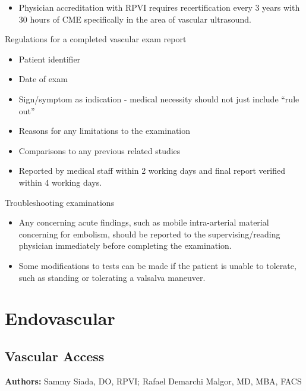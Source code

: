 \documentclass[
]{book}
\providecommand{\tightlist}{%
  \setlength{\itemsep}{0pt}\setlength{\parskip}{0pt}}
\begin{document}
\begin{itemize}
\tightlist
\item
  Physician accreditation with RPVI requires recertification every 3
  years with 30 hours of CME specifically in the area of vascular
  ultrasound.
\end{itemize}

Regulations for a completed vascular exam report\citep{iac2021}

\begin{itemize}
\item
  Patient identifier
\item
  Date of exam
\item
  Sign/symptom as indication - medical necessity should not just
  include ``rule out''
\item
  Reasons for any limitations to the examination
\item
  Comparisons to any previous related studies
\item
  Reported by medical staff within 2 working days and final report
  verified within 4 working days.
\end{itemize}

Troubleshooting examinations

\begin{itemize}
\item
  Any concerning acute findings, such as mobile intra-arterial
  material concerning for embolism, should be reported to the
  supervising/reading physician immediately before completing the
  examination.\citep{societyofdiagnosticmedicalsonography2015}
\item
  Some modifications to tests can be made if the patient is unable to
  tolerate, such as standing or tolerating a valsalva
  maneuver.\citep{societyofdiagnosticmedicalsonography2015}
\end{itemize}

\hypertarget{endovascular-2}{%
\chapter{Endovascular}\label{endovascular-2}}

\hypertarget{vascular-access}{%
\section{Vascular Access}\label{vascular-access}}

\textbf{Authors:} Sammy Siada, DO, RPVI; Rafael Demarchi Malgor, MD, MBA,
FACS
\end{document}
